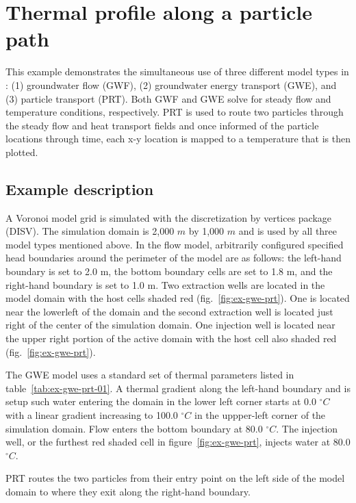 \section{Thermal profile along a particle path}

This example demonstrates the simultaneous use of three different model types in \mf: (1) groundwater flow (GWF), (2) groundwater energy transport (GWE), and (3) particle transport (PRT).  Both GWF and GWE solve for steady flow and temperature conditions, respectively. PRT is used to route two particles through the steady flow and heat transport fields and once informed of the particle locations through time, each x-y location is mapped to a temperature that is then plotted.

\subsection{Example description}

A Voronoi model grid is simulated with the discretization by vertices package (DISV).  The simulation domain is 2,000 $m$ by 1,000 $m$ and is used by all three model types mentioned above.  In the flow model, arbitrarily configured specified head boundaries around the perimeter of the model are as follows: the left-hand boundary is set to 2.0 m, the bottom boundary cells are set to 1.8 m, and the right-hand boundary is set to 1.0 m.  Two extraction wells are located in the model domain with the host cells shaded red ({fig.~\ref{fig:ex-gwe-prt}}).  One is located near the lowerleft of the domain and the second extraction well is located just right of the center of the simulation domain.  One injection well is located near the upper right portion of the active domain with the host cell also shaded red ({fig.~\ref{fig:ex-gwe-prt}}). 

The GWE model uses a standard set of thermal parameters listed in table~\ref{tab:ex-gwe-prt-01}.  A thermal gradient along the left-hand boundary and is setup such water entering the domain in the lower left corner starts at 0.0 $^{\circ}C$ with a linear gradient increasing to 100.0 $^{\circ}C$ in the uppper-left corner of the simulation domain.  Flow enters the bottom boundary at 80.0 $^{\circ}C$.  The injection well, or the furthest red shaded cell in figure~\ref{fig:ex-gwe-prt}, injects water at 80.0 $^{\circ}C$.

PRT routes the two particles from their entry point on the left side of the model domain to where they exit along the right-hand boundary.

